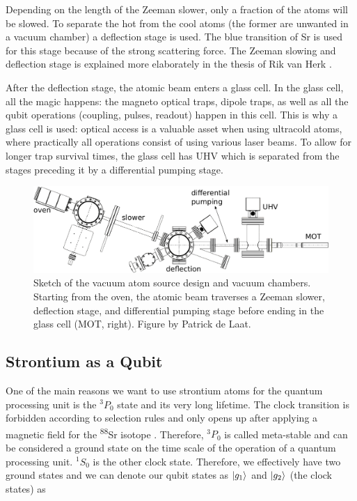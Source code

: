 Depending on the length of the Zeeman slower, only a fraction of the atoms will be slowed.
To separate the hot from the cool atoms (the former are unwanted in a vacuum chamber) a deflection stage is used. 
The blue transition of Sr is used for this stage because of the strong scattering force. 
The Zeeman slowing and deflection stage is explained more elaborately in the thesis of Rik van Herk \cite{Herk2022}.

After the deflection stage, the atomic beam enters a glass cell.
In the glass cell, all the magic happens: the magneto optical traps, dipole traps, as well as all the qubit operations (coupling, pulses, readout) happen in this cell.
This is why a glass cell is used: optical access is a valuable asset when using ultracold atoms, where practically all operations consist of using various laser beams.
To allow for longer trap survival times, the glass cell has \ac{UHV} which is separated from the stages preceding it by a differential pumping stage. 

\begin{figure}
	\centering
	\includegraphics[width=0.92\linewidth]{figures/SrLoading.pdf}
	\caption{Sketch of the vacuum atom source design and vacuum chambers. 
	Starting from the oven, the atomic beam traverses a Zeeman slower, deflection stage, and differential pumping stage before ending in the glass cell (MOT, right). 
	Figure by Patrick de Laat.}
	\label{fig:SrLoading}
\end{figure}

\subsection{Strontium as a Qubit}\label{sec:QubitScheme}

One of the main reasons we want to use strontium atoms for the quantum processing unit is the ${}^3P_0$ state and its very long lifetime. 
The clock transition is forbidden according to selection rules and only opens up after applying a magnetic field for the \textsuperscript{88}Sr isotope \cite{Knottnerus2018}.
Therefore, ${}^3P_0$ is called meta-stable and can be considered a ground state on the time scale of the operation of a quantum processing unit. 
${}^1S_0$ is the other clock state.
Therefore, we effectively have two ground states and we can denote our qubit states as $\lvert g_1\rangle$ and $\lvert g_2\rangle$ (the clock states) as


